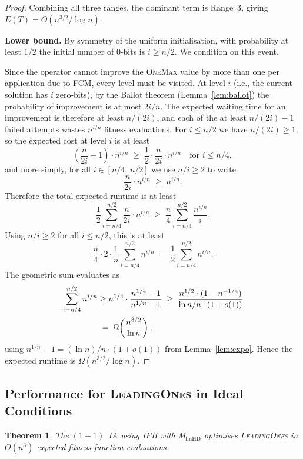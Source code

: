 \documentclass[lettersize,journal]{IEEEtran}
\newcommand{\rerev}[1]{\textcolor{black}{#1}}
\newcommand{\oneoneIA}{$(1+1)$~IA}
\newcommand{\linHD}{M$_{\text{linHD}}$}
\newcommand{\IPHfcm}{IPH}
\newtheorem{theorem}{Theorem}
\begin{document}
\begin{proof}
Combining all three ranges, the dominant term is Range~3, giving $E(T)=O(n^{3/2}/\log n)$.

\medskip
\noindent\textbf{Lower bound.}
By symmetry of the uniform initialisation, with probability at least $1/2$ the initial number of 0-bits is $i\geq n/2$. We condition on this event.

Since the operator cannot improve the \textsc{OneMax} value by more than one per application due to FCM, every level must be visited. At level $i$ (i.e., the current solution has $i$ zero-bits), by the Ballot theorem (Lemma~\ref{lem:ballot}) the probability of improvement is at most $2i/n$. The expected waiting time for an improvement is therefore at least $n/(2i)$, and each of the at least $n/(2i)-1$ failed attempts wastes $n^{i/n}$ fitness evaluations. For $i\leq n/2$ we have $n/(2i)\geq 1$, so the expected cost at level $i$ is at least
\[
\left(\frac{n}{2i}-1\right)\cdot n^{i/n}
\;\geq\; \frac{1}{2}\cdot\frac{n}{2i}\cdot n^{i/n}
\quad\text{for }i\leq n/4,
\]
and more simply, for all $i\in[n/4,\,n/2]$ we use $n/i\geq 2$ to write
\[
\frac{n}{2i}\cdot n^{i/n}\;\geq\; n^{i/n}.
\]
Therefore the total expected runtime is at least
\[
\frac{1}{2}\sum_{i=n/4}^{n/2}\frac{n}{2i}\cdot n^{i/n}
\;\geq\; \frac{n}{4}\sum_{i=n/4}^{n/2}\frac{n^{i/n}}{i}.
\]
Using $n/i\geq 2$ for all $i\leq n/2$, this is at least
\[
\frac{n}{4}\cdot 2\cdot\frac{1}{n}\sum_{i=n/4}^{n/2} n^{i/n}
\;=\;\frac{1}{2}\sum_{i=n/4}^{n/2} n^{i/n}.
\]
The geometric sum evaluates as
\begin{align*}
\sum_{i=n/4}^{n/2} n^{i/n}
\;&\rerev{\geq}\; n^{1/4}\cdot\frac{n^{1/4}-1}{n^{1/n}-1}
\;\geq\; \frac{n^{1/2}\cdot(1-n^{-1/4})}{\ln n/n\cdot(1+o(1))}\\
\;&=\;\Omega\!\left(\frac{n^{3/2}}{\ln n}\right),
\end{align*}
using $n^{1/n}-1=(\ln n)/n\cdot(1+o(1))$ from Lemma~\ref{lem:expo}.
Hence the expected runtime is $\Omega(n^{3/2}/\log n)$.
\end{proof}


 


\subsection{Performance for \textsc{LeadingOnes} in Ideal Conditions}

\setcounter{theorem}{2}
\begin{theorem} 
The {\oneoneIA } using \IPHfcm{} with {\linHD } optimises \textsc{LeadingOnes} in $\Theta(n^3)$ expected fitness function evaluations.
\end{theorem}
\end{document}
